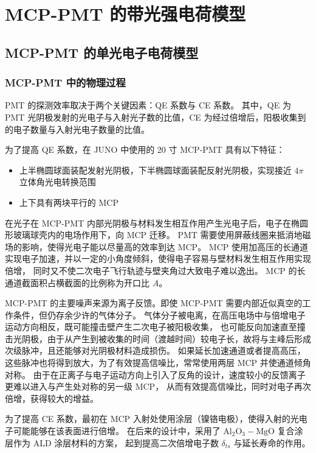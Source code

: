 
\chapter{MCP-PMT 的带光强电荷模型}

\section{MCP-PMT 的单光电子电荷模型}
\subsection{MCP-PMT 中的物理过程}\label{sec:mcp-pmt-process}
PMT 的探测效率取决于两个关键因素：QE 系数与 CE 系数。
其中，QE 为 PMT 光阴极发射的光电子与入射光子数的比值，CE 为经过倍增后，阳极收集到的电子数量与入射光电子数量的比值。

为了提高 QE 系数，在 JUNO 中使用的 20 寸 MCP-PMT 具有以下特征：
\begin{itemize}
    \item 上半椭圆球面装配发射光阴极，下半椭圆球面装配反射光阴极，实现接近 $4\pi$ 立体角光电转换范围
    \item 上下具有两块平行的 MCP
\end{itemize}

在光子在 MCP-PMT 内部光阴极与材料发生相互作用产生光电子后，电子在椭圆形玻璃球壳内的电场作用下，向 MCP 迁移。
PMT 需要使用屏蔽线圈来抵消地磁场的影响，使得光电子能以尽量高的效率到达 MCP。
MCP 使用加高压的长通道实现电子加速，并以一定的小角度倾斜，使得电子容易与壁材料发生相互作用实现倍增，
同时又不使二次电子飞行轨迹与壁夹角过大致电子难以逸出。
MCP 的长通道截面积占横截面的比例称为开口比 $A$。

MCP-PMT 的主要噪声来源为离子反馈\cite{MaterialStore2010}。即使 MCP-PMT 需要内部近似真空的工作条件，但仍存余少许的气体分子。
气体分子被电离，在高压电场中与倍增电子运动方向相反，既可能撞击壁产生二次电子被阳极收集，
也可能反向加速直至撞击光阴极，由于从产生到被收集的时间（渡越时间）较电子长，故将与主峰后形成次级脉冲，且还能够对光阴极材料造成损伤。
如果延长加速通道或者提高高压，这些脉冲也将得到放大，为了有效提高信噪比，常常使用两层 MCP 并使通道倾角对称。
由于在正离子与电子运动方向上引入了反角的设计，速度较小的反馈离子更难以进入与产生处对称的另一级 MCP，
从而有效提高信噪比，同时对电子再次倍增，获得较大的增益。

为了提高 CE 系数，最初在 MCP 入射处使用涂层（镍铬电极），使得入射的光电子可能能够在该表面进行倍增。
在后来的设计中，采用了 $\text{Al}_2\text{O}_3-\text{MgO}$ 复合涂层作为 ALD 涂层材料的方案，
起到提高二次倍增电子数 $\delta_{ts}$ 与延长寿命的作用。

